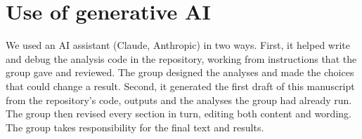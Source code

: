 \documentclass[9pt,twocolumn,twoside]{pnas-new}
\begin{document}
\showmatmethods{}


\bibsplit[3]

\section*{Use of generative AI}
We used an AI assistant (Claude, Anthropic) in two ways. First, it helped write and debug the analysis code in the repository, working from instructions that the group gave and reviewed. The group designed the analyses and made the choices that could change a result. Second, it generated the first draft of this manuscript from the repository's code, outputs and the analyses the group had already run. The group then revised every section in turn, editing both content and wording. The group takes responsibility for the final text and results.


\end{document}
